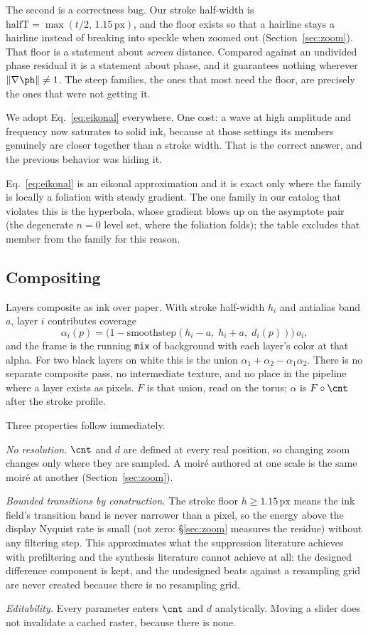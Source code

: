 The second is a correctness bug. Our stroke half-width is
$\mathrm{halfT}=\max(t/2,\,1.15\,\mathrm{px})$, and the floor exists so that a
hairline stays a hairline instead of breaking into speckle when zoomed out
(Section~\ref{sec:zoom}). That floor is a statement about \emph{screen} distance.
Compared against an undivided phase residual it is a statement about phase, and it
guarantees nothing wherever $\lVert\nabla\ph\rVert\neq1$. The steep
families, the ones that most need the floor, are precisely the ones that were
not getting it.

We adopt Eq.~\ref{eq:eikonal} everywhere. One cost: a wave at high amplitude
and frequency now saturates to solid ink, because at those settings its members
genuinely are closer together than a stroke width. That is the correct answer, and
the previous behavior was hiding it.

Eq.~\ref{eq:eikonal} is an eikonal approximation and it is exact only where the
family is locally a foliation with steady gradient. The one family in our
catalog that violates this is the hyperbola, whose gradient blows up on the
asymptote pair (the degenerate $n=0$ level set, where the foliation folds);
the table excludes that member from the family for this reason.

\subsection{Compositing}

Layers composite as ink over paper. With stroke half-width $h_i$ and antialias
band $a$, layer $i$ contributes coverage
\begin{equation}
  \alpha_i(p) = \Big(1-\mathrm{smoothstep}(h_i-a,\;h_i+a,\;d_i(p))\Big)\,o_i,
  \label{eq:alpha}
\end{equation}
and the frame is the running \texttt{mix} of background with each layer's color
at that alpha. For two black layers on white this is the union
$\alpha_1+\alpha_2-\alpha_1\alpha_2$. There is no separate composite pass, no
intermediate texture, and no place in the pipeline where a layer exists as pixels.
$F$ is that union, read on the torus; $\alpha$ is $F\circ\cnt$ after the
stroke profile.

Three properties follow immediately.

\emph{No resolution.} $\cnt$ and $d$ are defined at every real position, so
changing zoom changes only where they are sampled. A moir\'e authored at one scale
is the same moir\'e at another (Section~\ref{sec:zoom}).

\emph{Bounded transitions by construction.} The stroke floor
$h\ge1.15\,\mathrm{px}$ means the ink field's transition band is never narrower
than a pixel, so the energy above the display Nyquist rate is small (not zero:
\S\ref{sec:zoom} measures the residue) without any filtering step. This
approximates what the suppression literature achieves with prefiltering and the
synthesis literature cannot achieve at all: the designed difference component is
kept, and the undesigned beats against a resampling grid are never created
because there is no resampling grid.

\emph{Editability.} Every parameter enters $\cnt$ and $d$ analytically. Moving a
slider does not invalidate a cached raster, because there is none.
